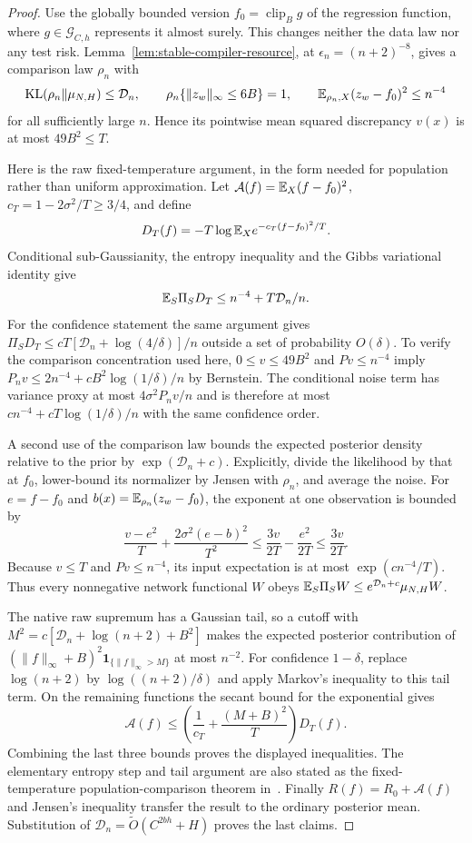 \begin{proof}
Use the globally bounded version $f_0=\operatorname{clip}_B g$ of the
regression function, where $g\in\mathcal G_{C,h}$ represents it almost
surely.  This changes neither the data law nor any test risk.
Lemma~\ref{lem:stable-compiler-resource}, at $\epsilon_n=(n+2)^{-8}$,
gives a comparison law $\rho_n$ with
\[
 \operatorname{KL}(\rho_n\|\mu_{N,H})\le\mathcal D_n,\qquad
 \rho_n\{\|z_w\|_\infty\le6B\}=1,\qquad
 \mathbb E_{\rho_n,X}(z_w-f_0)^2\le n^{-4}
\]
for all sufficiently large $n$.  Hence its pointwise mean squared
discrepancy $v(x)$ is at most $49B^2\le T$.

Here is the raw fixed-temperature argument, in the form needed for
population rather than uniform approximation.  Let
$\mathcal A(f)=\mathbb E_X(f-f_0)^2$, $c_T=1-2\sigma^2/T\ge3/4$, and define
\[
 D_T(f)=-T\log\mathbb E_X e^{-c_T(f-f_0)^2/T}.
\]
Conditional sub-Gaussianity, the entropy inequality and the Gibbs
variational identity give
\[
 \mathbb E_S\Pi_S D_T\le n^{-4}+T\mathcal D_n/n.
\]
For the confidence statement the same argument gives
$\Pi_SD_T\le cT[\mathcal D_n+\log(4/\delta)]/n$ outside a set of
probability $O(\delta)$.  To verify the comparison concentration used
here, $0\le v\le49B^2$ and $Pv\le n^{-4}$ imply
$P_nv\le2n^{-4}+cB^2\log(1/\delta)/n$ by Bernstein.  The conditional
noise term has variance proxy at most $4\sigma^2P_nv/n$ and is therefore
at most $cn^{-4}+cT\log(1/\delta)/n$ with the same confidence order.

A second use of the comparison law bounds the expected posterior
density relative to the prior by $\exp(\mathcal D_n+c)$.  Explicitly,
divide the likelihood by that at $f_0$, lower-bound its normalizer by
Jensen with $\rho_n$, and average the noise.  For $e=f-f_0$ and
$b(x)=\mathbb E_{\rho_n}(z_w-f_0)$, the exponent at one observation is bounded by
\[
 \frac{v-e^2}{T}+\frac{2\sigma^2(e-b)^2}{T^2}
                    \le\frac{3v}{2T}-\frac{e^2}{2T}
                    \le\frac{3v}{2T}.
\]
Because $v\le T$ and $Pv\le n^{-4}$, its input expectation is at most
$\exp(cn^{-4}/T)$.  Thus every nonnegative network functional $W$ obeys
$\mathbb E_S\Pi_SW\le e^{\mathcal D_n+c}\mu_{N,H}W$.

The native raw supremum has a Gaussian tail, so a cutoff with
$M^2=c[\mathcal D_n+\log(n+2)+B^2]$ makes the expected posterior
contribution of $(\|f\|_\infty+B)^2\mathbf1_{\{\|f\|_\infty>M\}}$
at most $n^{-2}$.  For confidence $1-\delta$, replace $\log(n+2)$ by
$\log((n+2)/\delta)$ and apply Markov's inequality to this tail term.
On the remaining functions the secant bound for the exponential gives
\[
 \mathcal A(f)\le
 \left(\frac1{c_T}+\frac{(M+B)^2}{T}\right)D_T(f).
\]
Combining the last three bounds proves the displayed inequalities.
The elementary entropy step and tail argument are also stated as the
fixed-temperature population-comparison theorem in~\cite{rawprior}.
Finally $R(f)=R_0+\mathcal A(f)$ and Jensen's inequality transfer the
result to the ordinary posterior mean.  Substitution of
$\mathcal D_n=\widetilde O(C^{2bh}+H)$ proves the last claims.
\end{proof}
